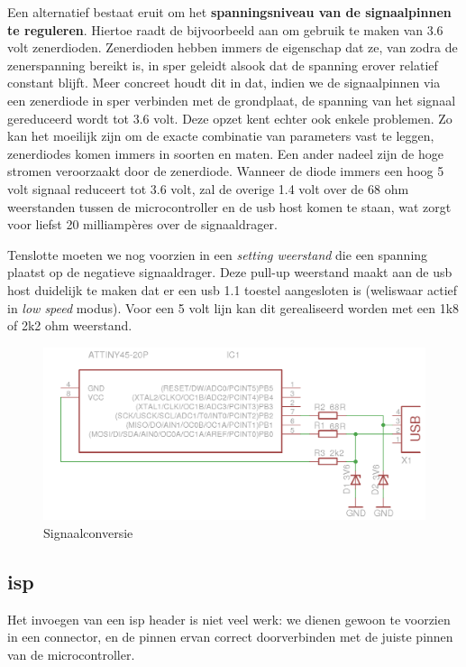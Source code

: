 \documentclass[verslag.tex]{subfiles}
\begin{document}
Een alternatief bestaat eruit om het \textbf{spanningsniveau van de signaalpinnen te reguleren}. Hiertoe raadt de  bijvoorbeeld aan om gebruik te maken van 3.6 volt zenerdioden. Zenerdioden hebben immers de eigenschap dat ze, van zodra de zenerspanning bereikt is, in sper geleidt alsook dat de spanning erover relatief constant blijft. Meer concreet houdt dit in dat, indien we de signaalpinnen via een zenerdiode in sper verbinden met de grondplaat, de spanning van het signaal gereduceerd wordt tot 3.6 volt. Deze opzet kent echter ook enkele problemen. Zo kan het moeilijk zijn om de exacte combinatie van parameters vast te leggen, zenerdiodes komen immers in soorten en maten. Een ander nadeel zijn de hoge stromen veroorzaakt door de zenerdiode. Wanneer de diode immers een hoog 5 volt signaal reduceert tot 3.6 volt, zal de overige 1.4 volt over de 68 ohm weerstanden tussen de microcontroller en de \ac{usb} host komen te staan, wat zorgt voor liefst 20 milliampères over de signaaldrager.

Tenslotte moeten we nog voorzien in een \emph{setting weerstand} die een spanning plaatst op de negatieve signaaldrager. Deze pull-up weerstand maakt aan de \ac{usb} host duidelijk te maken dat er een \ac{usb} 1.1 toestel aangesloten is (weliswaar actief in \emph{low speed} modus). Voor een 5 volt lijn kan dit gerealiseerd worden met een 1k8 of 2k2 ohm weerstand.

\begin{figure}
	\includegraphics[width=\textwidth]{afbeeldingen/circuit_signaal}
	\caption{Signaalconversie}
\end{figure}

\subsection{\acs{isp}}

Het invoegen van een \ac{isp} header is niet veel werk: we dienen gewoon te voorzien in een connector, en de pinnen ervan correct doorverbinden met de juiste pinnen van de microcontroller.
\end{document}
